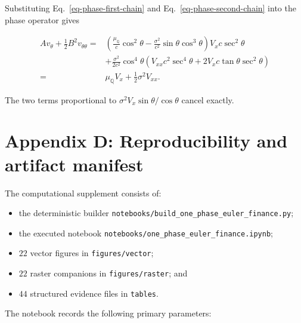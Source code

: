 \documentclass[
  english,
  10pt,
  letterpaper,
  DIV=11,
  numbers=noendperiod]{scrartcl}
\providecommand{\tightlist}{%
  \setlength{\itemsep}{0pt}\setlength{\parskip}{0pt}}
\theoremstyle{definition}
\theoremstyle{plain}
\theoremstyle{plain}
\theoremstyle{remark}
\begin{document}
Substituting Eq.~\ref{eq-phase-first-chain} and
Eq.~\ref{eq-phase-second-chain} into the phase operator gives

\[
\begin{aligned}
Av_\theta+\frac12B^2v_{\theta\theta}
={}&
\left(
\frac{\mu_{\mathbb Q}}c\cos^2\theta
-\frac{\sigma^2}{c^2}\sin\theta\cos^3\theta
\right)
V_xc\sec^2\theta\\
&+
\frac{\sigma^2}{2c^2}\cos^4\theta
\left(
V_{xx}c^2\sec^4\theta
+2V_xc\tan\theta\sec^2\theta
\right)\\
={}&
\mu_{\mathbb Q}V_x+\frac12\sigma^2V_{xx}.
\end{aligned}
\]

The two terms proportional to \(\sigma^2V_x\sin\theta/\cos\theta\)
cancel exactly.

\section*{Appendix D: Reproducibility and artifact
manifest}\label{sec-reproducibility}

The computational supplement consists of:

\begin{itemize}
\tightlist
\item
  the deterministic builder
  \texttt{notebooks/build\_one\_phase\_euler\_finance.py};
\item
  the executed notebook
  \texttt{notebooks/one\_phase\_euler\_finance.ipynb};
\item
  \(22\) vector figures in \texttt{figures/vector};
\item
  \(22\) raster companions in \texttt{figures/raster}; and
\item
  \(44\) structured evidence files in \texttt{tables}.
\end{itemize}

The notebook records the following primary parameters:
\end{document}
